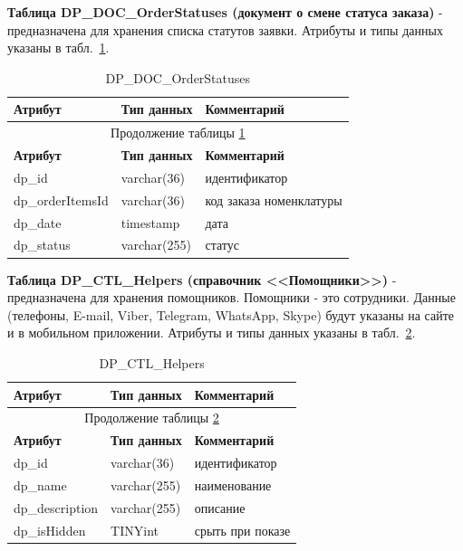 \textbf{Таблица DP\_DOC\_OrderStatuses (документ о смене статуса заказа)} - предназначена для хранения списка статутов заявки.
Атрибуты и типы данных указаны в табл.~\ref{tab:DP_LST_OrderStatuses}.

\begin{longtable}{|p{5.5cm}|p{3.5cm}|p{7.5cm}|}
    \caption{DP\_DOC\_OrderStatuses} \label{tab:DP_LST_OrderStatuses} \\
    \hline
    \textbf{Атрибут} & \textbf{Тип данных} & \textbf{Комментарий} \\ \hline
    \endfirsthead

    \multicolumn{3}{c}{Продолжение таблицы \ref{tab:DP_LST_OrderStatuses}} \\
    \hline
    \textbf{Атрибут} & \textbf{Тип данных} & \textbf{Комментарий} \\ \hline
    \endhead

    \endfoot

    \endlastfoot
    dp\_id & varchar(36) & идентификатор \\ \hline
    dp\_orderItemsId & varchar(36) & код заказа номенклатуры \\ \hline
    dp\_date & timestamp & дата \\ \hline
    dp\_status & varchar(255) & статус \\ \hline
\end{longtable}

\textbf{Таблица DP\_CTL\_Helpers (справочник <<Помощники>>)} - предназначена для хранения помощников.
Помощники - это сотрудники.
Данные (телефоны, E-mail, Viber, Telegram, WhatsApp, Skype) будут указаны на сайте и в мобильном приложении.
Атрибуты и типы данных указаны в табл.~\ref{tab:DP_CTL_Helpers}.

\begin{longtable}{|p{5.5cm}|p{3.5cm}|p{7.5cm}|}
    \caption{DP\_CTL\_Helpers} \label{tab:DP_CTL_Helpers} \\
    \hline
    \textbf{Атрибут} & \textbf{Тип данных} & \textbf{Комментарий} \\ \hline
    \endfirsthead

    \multicolumn{3}{c}{Продолжение таблицы \ref{tab:DP_CTL_Helpers}} \\
    \hline
    \textbf{Атрибут} & \textbf{Тип данных} & \textbf{Комментарий} \\ \hline
    \endhead

    \endfoot

    \endlastfoot
    dp\_id & varchar(36) & идентификатор \\ \hline
    dp\_name & varchar(255) & наименование \\ \hline
    dp\_description & varchar(255) & описание \\ \hline
    dp\_isHidden & TINYint & срыть при показе \\ \hline
\end{longtable}

